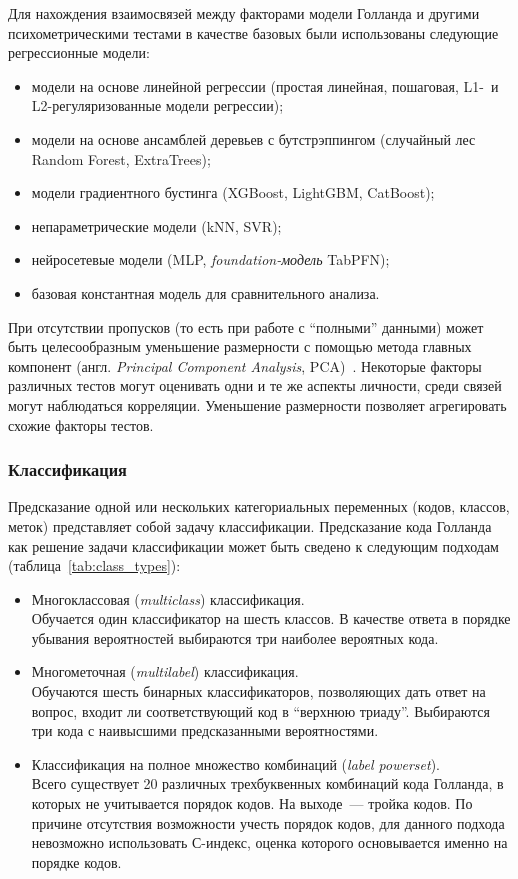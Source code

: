 Для нахождения взаимосвязей между факторами модели Голланда и другими психометрическими тестами в качестве базовых были использованы следующие регрессионные модели:
\begin{itemize}
    \item модели на основе линейной регрессии (простая линейная, пошаговая, L1-~и \mbox{L2-ре}\-гуля\-ризо\-ванные модели регрессии);
    \item модели на основе ансамблей деревьев с бутстрэппингом (случайный лес Random Forest, ExtraTrees);
    \item модели градиентного бустинга (XGBoost, LightGBM, CatBoost);
    \item непараметрические модели (kNN, SVR);
    \item нейросетевые модели (MLP, \emph{foundation-модель} TabPFN);
    \item базовая константная модель для сравнительного анализа.
\end{itemize}

При отсутствии пропусков (то есть при работе с \enquote{полными} данными) может быть целесообразным уменьшение размерности с помощью метода главных компонент (англ. \emph{Principal Component Analysis}, PCA)~\cite{Bishop}. Некоторые факторы различных тестов могут оценивать одни и те же аспекты личности, среди связей могут наблюдаться корреляции. Уменьшение размерности позволяет агрегировать схожие факторы тестов.


\subsubsection{Классификация}
\label{subsec:classif}

Предсказание одной или нескольких категориальных переменных (кодов, классов, меток) представляет собой задачу классификации. Предсказание кода Голланда как решение задачи классификации может быть сведено к следующим подходам~\cite{ZhangMin} (таблица~\ref{tab:class_types}):
\begin{itemize}
    \item Многоклассовая (\emph{multiclass}) классификация.\\
    Обучается один классификатор на шесть классов. В качестве ответа в порядке убывания вероятностей выбираются три наиболее вероятных кода.
    \item Многометочная (\emph{multilabel}) классификация.\\
    Обучаются шесть бинарных классификаторов, позволяющих дать ответ на вопрос, входит ли соответствующий код в \enquote{верхнюю триаду}. Выбираются три кода с наивысшими предсказанными вероятностями.
    \item Классификация на полное множество комбинаций (\emph{label powerset}).\\
    Всего существует 20 различных трехбуквенных комбинаций кода Голланда, в которых не учитывается порядок кодов. На выходе~--- тройка кодов. По причине отсутствия возможности учесть порядок кодов, для данного подхода невозможно использовать С-индекс, оценка которого основывается именно на порядке кодов.
\end{itemize}

